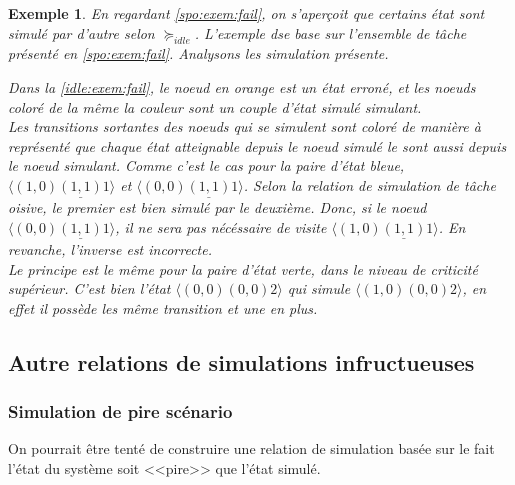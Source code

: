 \documentclass[12pt,a4paper,oneside]{book}
\theoremstyle{break}
\newtheorem{exem}{Exemple}[chapter]
\theoremstyle{breakplain}
\begin{document}
\begin{exem}
En regardant \autoref{spo:exem:fail}, on s'aperçoit que certains état sont simulé par d'autre selon $\succeq_{idle}$. L'exemple dse base sur l'ensemble de tâche présenté en \autoref{spo:exem:fail}. Analysons les simulation présente.

\begin{figure}[h]

\centering

\def\svgwidth{\columnwidth}

\label{idle:exem:fail}


\end{figure} 

Dans la \autoref{idle:exem:fail}, le noeud en orange est un état erroné, et les noeuds coloré de la même la couleur sont un couple d'état simulé simulant.\\

Les transitions sortantes des noeuds qui se simulent sont coloré de manière à représenté que  chaque état atteignable depuis le noeud simulé le sont aussi depuis le noeud simulant. Comme c'est le cas pour la paire d'état bleue, $\langle (1,0) \underline{(1,1)} 1 \rangle$ et $\langle (0,0) \underline{(1,1)} 1 \rangle$. Selon la relation de simulation de tâche oisive, le premier est bien simulé par le deuxième. Donc, si le noeud $\langle (0,0) \underline{(1,1)} 1 \rangle$, il ne sera pas nécéssaire de visite $\langle (1,0) \underline{(1,1)} 1 \rangle$. En revanche, l'inverse est incorrecte.\\

Le principe est le même pour la paire d'état verte, dans le niveau de criticité supérieur. C'est bien l'état $\langle (0,0) (0,0) 2 \rangle$ qui simule $\langle (1,0) (0,0) 2 \rangle$, en effet il possède les même transition et une en plus.


\end{exem}


\subsection{Autre relations de simulations infructueuses}

\subsubsection{Simulation de pire scénario}

On pourrait être tenté de construire une relation de simulation basée sur le fait l'état du système soit <<pire>> que l'état simulé.
\end{document}
